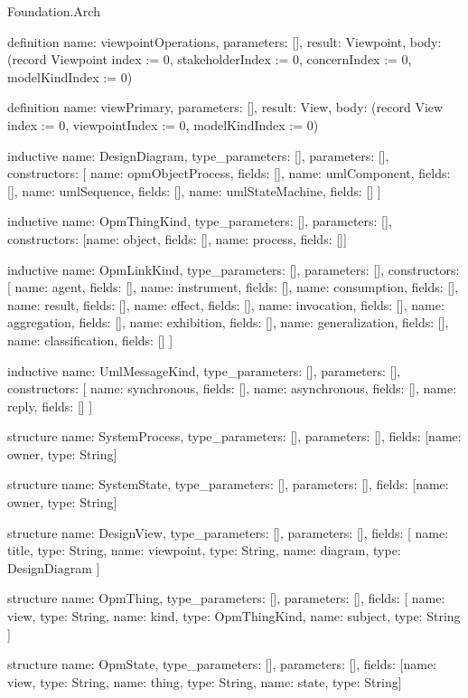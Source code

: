\begin{lexlean}{Foundation.Arch}
\begin{semanticmodule}
definition{
  name: viewpointOperations,
  parameters: [],
  result: Viewpoint,
  body: (record Viewpoint {index := 0, stakeholderIndex := 0, concernIndex := 0, modelKindIndex := 0})
}

definition{
  name: viewPrimary,
  parameters: [],
  result: View,
  body: (record View {index := 0, viewpointIndex := 0, modelKindIndex := 0})
}

inductive{
  name: DesignDiagram,
  type_parameters: [],
  parameters: [],
  constructors: [
    {name: opmObjectProcess, fields: []},
    {name: umlComponent, fields: []},
    {name: umlSequence, fields: []},
    {name: umlStateMachine, fields: []}
  ]
}

inductive{
  name: OpmThingKind,
  type_parameters: [],
  parameters: [],
  constructors: [{name: object, fields: []}, {name: process, fields: []}]
}

inductive{
  name: OpmLinkKind,
  type_parameters: [],
  parameters: [],
  constructors: [
    {name: agent, fields: []},
    {name: instrument, fields: []},
    {name: consumption, fields: []},
    {name: result, fields: []},
    {name: effect, fields: []},
    {name: invocation, fields: []},
    {name: aggregation, fields: []},
    {name: exhibition, fields: []},
    {name: generalization, fields: []},
    {name: classification, fields: []}
  ]
}

inductive{
  name: UmlMessageKind,
  type_parameters: [],
  parameters: [],
  constructors: [
    {name: synchronous, fields: []},
    {name: asynchronous, fields: []},
    {name: reply, fields: []}
  ]
}

structure{
  name: SystemProcess,
  type_parameters: [],
  parameters: [],
  fields: [{name: owner, type: String}]
}

structure{
  name: SystemState,
  type_parameters: [],
  parameters: [],
  fields: [{name: owner, type: String}]
}

structure{
  name: DesignView,
  type_parameters: [],
  parameters: [],
  fields: [
    {name: title, type: String},
    {name: viewpoint, type: String},
    {name: diagram, type: DesignDiagram}
  ]
}

structure{
  name: OpmThing,
  type_parameters: [],
  parameters: [],
  fields: [
    {name: view, type: String},
    {name: kind, type: OpmThingKind},
    {name: subject, type: String}
  ]
}

structure{
  name: OpmState,
  type_parameters: [],
  parameters: [],
  fields: [{name: view, type: String}, {name: thing, type: String}, {name: state, type: String}]
}


\end{semanticmodule}
\end{lexlean}
